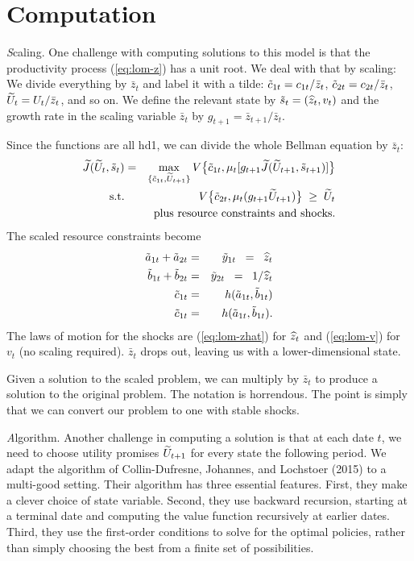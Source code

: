 
\section{Computation}
\label{app:computation_BCFL}

{\textit Scaling.\/}
One challenge with computing solutions to this model is that the
productivity process (\ref{eq:lom-z}) has a unit root.
We deal with that by scaling: We divide everything by
$\bar{z}_t$ and label it with a tilde:  $\tilde{c}_{1t} = c_{1t} / \bar{z}_t$,
$\tilde{c}_{2t} = c_{2t} / \bar{z}_t$, $\widetilde{U}_{t} = U_{t} / \bar{z}_t$, and so on.
We define the relevant state by $ \tilde{s}_t = (\widehat{z}_t, v_t)$
and the growth rate in the scaling variable $\bar{z}_t$ by
$g_{t+1} = \bar{z}_{t+1} / \bar{z}_t $.

Since the functions are all hd1, we can divide the whole Bellman equation by $\bar{z}_t$:
\begin{eqnarray*}
    \widetilde{J}(\widetilde{U}_t, \tilde{s}_t) &=& \max_{\{\tilde{c}_{1t}, \widetilde{U}_{t+1} \}}
            V \big\{ \tilde{c}_{1t}, \mu_t [g_{t+1} \widetilde{J}(\widetilde{U}_{t+1}, \tilde{s}_{t+1})] \big\} \\
    \mbox{s.t.} && V \big\{ \tilde{c}_{2t}, \mu_t (g_{t+1} \widetilde{U}_{t+1}) \big\} \;\geq\; \widetilde{U}_{t} \\
            && \mbox{plus resource constraints and shocks} .
\end{eqnarray*}
The scaled resource constraints become
\begin{eqnarray*}
    \tilde{a}_{1t} + \tilde{a}_{2t} &=&  \tilde{y}_{1t} \;\;=\;\; \widehat{z}_{t} \\
    \tilde{b}_{1t} + \tilde{b}_{2t} &=&  \tilde{y}_{2t} \;\;=\;\; 1/\widehat{z}_{t} \\
    \tilde{c}_{1t} &=&  h (\tilde{a}_{1t}, \tilde{b}_{1t} ) \\
    \tilde{c}_{1t} &=&  h (\tilde{a}_{1t}, \tilde{b}_{1t} ) .
\end{eqnarray*}
The laws of motion for the shocks are
(\ref{eq:lom-zhat}) for $\widehat{z}_t$ and (\ref{eq:lom-v}) for $v_t$ (no scaling required).
$\bar{z}_t$ drops out, leaving us with a lower-dimensional state.


Given a solution to the scaled problem, we can multiply by $\bar{z}_t$
to produce a solution to the original problem.
The notation is horrendous.
The point is simply that we can
convert our problem to one with stable shocks.


{\textit Algorithm.\/}
Another challenge in computing a solution is that at each date $t$,
we need to choose utility promises $\widetilde{U}_{t+1}$
for every state the following period.
We adapt the algorithm of Collin-Dufresne, Johannes, and Lochstoer (2015) to a multi-good setting.
Their algorithm has three essential features.
First, they make a clever choice of state variable.
Second, they use backward recursion, starting at a terminal date and computing the value
function recursively at earlier dates.
Third, they use the first-order conditions to solve for the optimal policies,
rather than simply choosing the best from a finite set of possibilities.

